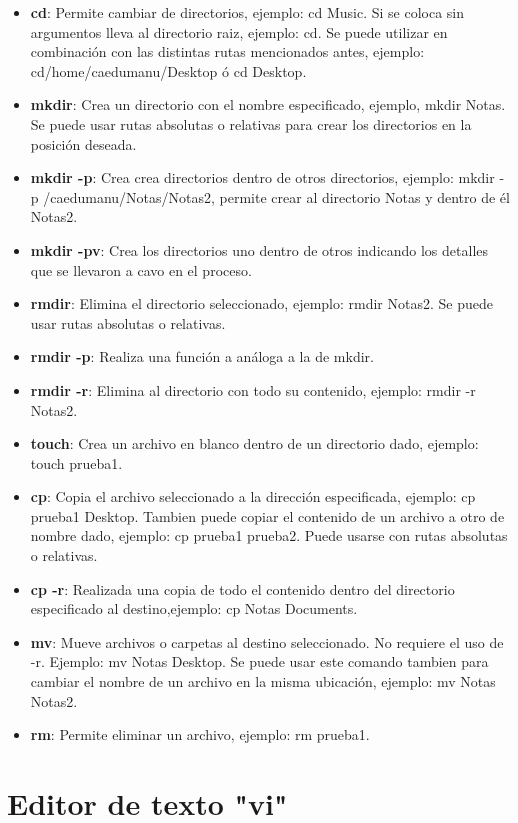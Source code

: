 \documentclass[a4paper,12pt]{article}
\begin{document}
\begin{itemize}
\item{\textbf{cd}}: Permite cambiar de directorios, ejemplo: cd Music. Si se coloca sin argumentos lleva al directorio raiz, ejemplo: cd. Se puede utilizar en combinación con las distintas rutas mencionados antes, ejemplo: cd/home/caedumanu/Desktop
ó cd Desktop.
\item{\textbf{mkdir}}: Crea un directorio con el nombre especificado, ejemplo, mkdir Notas. Se puede usar rutas absolutas o relativas para crear los directorios en la
posición deseada.
\item{\textbf{mkdir -p}}: Crea crea directorios dentro de otros directorios, ejemplo: mkdir -p /caedumanu/Notas/Notas2, permite crear al directorio Notas y dentro de él Notas2.
\item{\textbf{mkdir -pv}}: Crea los directorios uno dentro de otros indicando los detalles que se llevaron a cavo en el proceso.
\item{\textbf{rmdir}}: Elimina el directorio seleccionado, ejemplo: rmdir Notas2. Se puede usar rutas absolutas o relativas.
\item{\textbf{rmdir -p}}: Realiza una función a análoga a la de mkdir.
\item{\textbf{rmdir -r}}: Elimina al directorio con todo su contenido, ejemplo: rmdir -r Notas2.
\item{\textbf{touch}}: Crea un archivo en blanco dentro de un directorio dado, ejemplo: touch prueba1.
\item{\textbf{cp}}: Copia el archivo seleccionado a la dirección especificada, ejemplo: cp prueba1 Desktop. Tambien puede copiar el contenido de un archivo a otro de nombre dado, ejemplo: cp prueba1 prueba2. Puede usarse con rutas absolutas
o relativas.
\item{\textbf{cp -r}}: Realizada una copia de todo el contenido dentro del directorio especificado al destino,ejemplo: cp Notas Documents.
\item{\textbf{mv}}: Mueve archivos o carpetas al destino seleccionado. No requiere el uso de -r. Ejemplo: mv Notas Desktop. Se puede usar este comando tambien para cambiar el nombre de un archivo en la misma ubicación, ejemplo: mv Notas
Notas2.
\item{\textbf{rm}}: Permite eliminar un archivo, ejemplo: rm prueba1.
\end{itemize}

\section{Editor de texto "vi"}
\end{document}
